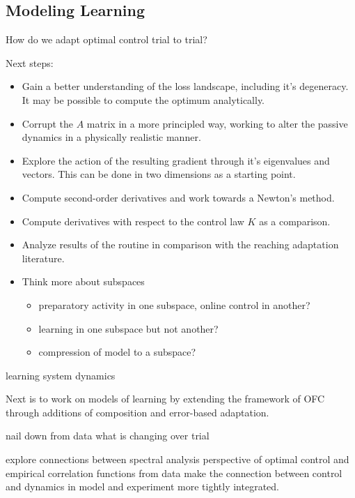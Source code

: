 \documentclass[
  a4paper,
]{article}
\providecommand{\tightlist}{%
  \setlength{\itemsep}{0pt}\setlength{\parskip}{0pt}}
\begin{document}
\hypertarget{modeling-learning}{%
\subsection{Modeling Learning}\label{modeling-learning}}

How do we adapt optimal control trial to trial?

Next steps:

\begin{itemize}
\tightlist
\item
  Gain a better understanding of the loss landscape, including it's
  degeneracy. It may be possible to compute the optimum analytically.
\item
  Corrupt the \(A\) matrix in a more principled way, working to alter
  the passive dynamics in a physically realistic manner.
\item
  Explore the action of the resulting gradient through it's eigenvalues
  and vectors. This can be done in two dimensions as a starting point.
\item
  Compute second-order derivatives and work towards a Newton's method.
\item
  Compute derivatives with respect to the control law \(K\) as a
  comparison.
\item
  Analyze results of the routine in comparison with the reaching
  adaptation literature.
\item
  Think more about subspaces

  \begin{itemize}
  \tightlist
  \item
    preparatory activity in one subspace, online control in another?
  \item
    learning in one subspace but not another?
  \item
    compression of model to a subspace?
  \end{itemize}
\end{itemize}

learning system dynamics

Next is to work on models of learning by extending the framework of OFC
through additions of composition and error-based adaptation.

nail down from data what is changing over trial

explore connections between spectral analysis perspective of optimal
control and empirical correlation functions from data make the
connection between control and dynamics in model and experiment more
tightly integrated.
\end{document}
